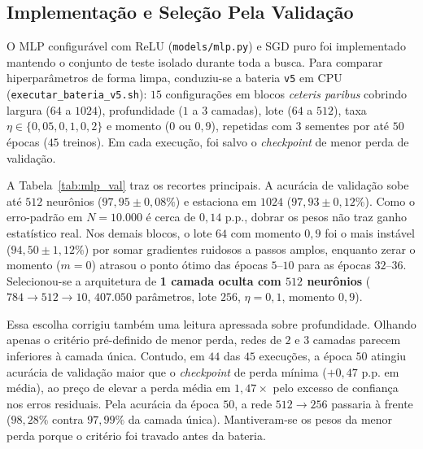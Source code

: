 \documentclass[
	12pt,
	a4paper,
	article,
	twocolumn
]{abntex2}
\begin{document}
\subsection{Implementação e Seleção Pela Validação}

O MLP configurável com ReLU (\texttt{models/mlp.py}) e SGD puro foi implementado mantendo o conjunto de teste isolado durante toda a busca. Para comparar hiperparâmetros de forma limpa, conduziu-se a bateria \texttt{v5} em CPU (\texttt{executar\_bateria\_v5.sh}): $15$ configurações em blocos \textit{ceteris paribus} cobrindo largura ($64$ a $1024$), profundidade ($1$ a $3$ camadas), lote ($64$ a $512$), taxa $\eta \in \{0{,}05, 0{,}1, 0{,}2\}$ e momento ($0$ ou $0{,}9$), repetidas com $3$ sementes por até $50$ épocas ($45$ treinos). Em cada execução, foi salvo o \textit{checkpoint} de menor perda de validação.

A Tabela~\ref{tab:mlp_val} traz os recortes principais. A acurácia de validação sobe até $512$ neurônios ($97{,}95 \pm 0{,}08\%$) e estaciona em $1024$ ($97{,}93 \pm 0{,}12\%$). Como o erro-padrão em $N = 10.000$ é cerca de $0{,}14\text{ p.p.}$, dobrar os pesos não traz ganho estatístico real. Nos demais blocos, o lote $64$ com momento $0{,}9$ foi o mais instável ($94{,}50 \pm 1{,}12\%$) por somar gradientes ruidosos a passos amplos, enquanto zerar o momento ($m = 0$) atrasou o ponto ótimo das épocas $5$--$10$ para as épocas $32$--$36$. Selecionou-se a arquitetura de \textbf{1 camada oculta com $512$ neurônios} ($784 \to 512 \to 10$, $407.050$ parâmetros, lote $256$, $\eta = 0{,}1$, momento $0{,}9$).

Essa escolha corrigiu também uma leitura apressada sobre profundidade. Olhando apenas o critério pré-definido de menor perda, redes de $2$ e $3$ camadas parecem inferiores à camada única. Contudo, em $44$ das $45$ execuções, a época $50$ atingiu acurácia de validação maior que o \textit{checkpoint} de perda mínima ($+0{,}47\text{ p.p.}$ em média), ao preço de elevar a perda média em $1{,}47\times$ pelo excesso de confiança nos erros residuais. Pela acurácia da época $50$, a rede $512 \to 256$ passaria à frente ($98{,}28\%$ contra $97{,}99\%$ da camada única). Mantiveram-se os pesos da menor perda porque o critério foi travado antes da bateria.
\end{document}
